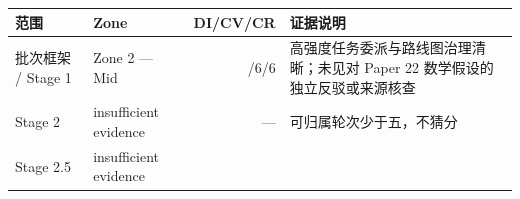 \documentclass[12pt,a4paper]{article}
\begin{document}
\begin{longtable}[]{@{}llrl@{}}
\toprule
\begin{minipage}[b]{0.20\columnwidth}\raggedright
范围\strut
\end{minipage} & \begin{minipage}[b]{0.20\columnwidth}\raggedright
Zone\strut
\end{minipage} & \begin{minipage}[b]{0.27\columnwidth}\raggedleft
DI/CV/CR\strut
\end{minipage} & \begin{minipage}[b]{0.20\columnwidth}\raggedright
证据说明\strut
\end{minipage}\tabularnewline
\midrule
\endhead
\begin{minipage}[t]{0.20\columnwidth}\raggedright
批次框架 / Stage 1\strut
\end{minipage} & \begin{minipage}[t]{0.20\columnwidth}\raggedright
Zone 2 --- Mid\strut
\end{minipage} & \begin{minipage}[t]{0.27\columnwidth}\raggedleft
8/6/6\strut
\end{minipage} & \begin{minipage}[t]{0.20\columnwidth}\raggedright
高强度任务委派与路线图治理清晰；未见对 Paper 22
数学假设的独立反驳或来源核查\strut
\end{minipage}\tabularnewline
\begin{minipage}[t]{0.20\columnwidth}\raggedright
Stage 2\strut
\end{minipage} & \begin{minipage}[t]{0.20\columnwidth}\raggedright
insufficient evidence\strut
\end{minipage} & \begin{minipage}[t]{0.27\columnwidth}\raggedleft
---\strut
\end{minipage} & \begin{minipage}[t]{0.20\columnwidth}\raggedright
可归属轮次少于五，不猜分\strut
\end{minipage}\tabularnewline
\begin{minipage}[t]{0.20\columnwidth}\raggedright
Stage 2.5\strut
\end{minipage} & \begin{minipage}[t]{0.20\columnwidth}\raggedright
insufficient evidence\strut
\end{minipage} & \begin{minipage}[t]{0.27\columnwidth}\raggedleft

\end{minipage}
\end{longtable}
\end{document}
